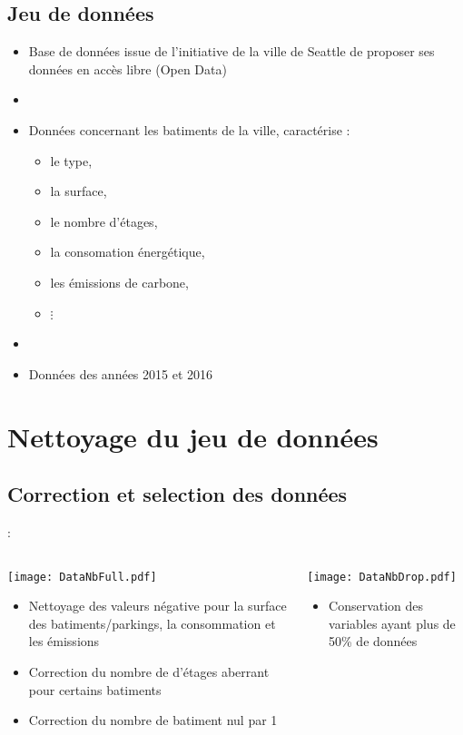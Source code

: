 \documentclass[8pt,aspectratio=169,hyperref={unicode=true}]{beamer}
\begin{document}
\subsection{Jeu de données}
\begin{frame}{\insertsubsection}
  \begin{itemize}
    \item Base de données issue de l'initiative de la ville de Seattle de proposer ses
          données en accès libre (Open Data)
    \item[]
    \item Données concernant les batiments de la ville, caractérise :
          \begin{itemize}
            \item le type,
            \item la surface,
            \item le nombre d'étages,
            \item la consomation énergétique,
            \item les émissions de carbone,
            \item $\vdots$
          \end{itemize}
    \item[]
    \item Données des années 2015 et 2016
  \end{itemize}
\end{frame}

\section{Nettoyage du jeu de données}
\subsection{Correction et selection des données}
\begin{frame}{\insertsection : \insertsubsection}
  \begin{columns}[t]
    \begin{column}{.5\textwidth}
      \texttt{[image: DataNbFull.pdf]}
      \begin{itemize}
        \item Nettoyage des valeurs négative pour la surface des batiments/parkings,
              la consommation et les émissions
        \item Correction du nombre de d'étages aberrant pour certains batiments
        \item Correction du nombre de batiment nul par 1
      \end{itemize}
    \end{column}
    \begin{column}{.5\textwidth}
      \texttt{[image: DataNbDrop.pdf]}
      \begin{itemize}
        \item Conservation des variables ayant plus de 50\% de données
      \end{itemize}
    \end{column}
  \end{columns}
\end{frame}
\end{document}
